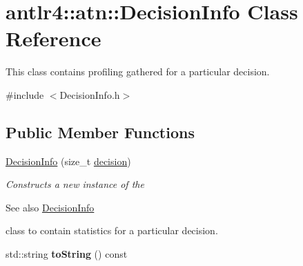 \hypertarget{classantlr4_1_1atn_1_1DecisionInfo}{}\section{antlr4\+:\+:atn\+:\+:Decision\+Info Class Reference}
\label{classantlr4_1_1atn_1_1DecisionInfo}


This class contains profiling gathered for a particular decision.  




{\ttfamily \#include $<$Decision\+Info.\+h$>$}

\subsection*{Public Member Functions}
\begin{DoxyCompactItemize}
\item 
\hyperlink{classantlr4_1_1atn_1_1DecisionInfo_a99833736f88c09563a01b57284742b88}{Decision\+Info} (size\+\_\+t \hyperlink{classantlr4_1_1atn_1_1DecisionInfo_ad81f14a210fb5e80f86ac800d56cc7bb}{decision})
\begin{DoxyCompactList}\small\item\em Constructs a new instance of the \begin{DoxySeeAlso}{See also}
\hyperlink{classantlr4_1_1atn_1_1DecisionInfo}{Decision\+Info}


\end{DoxySeeAlso}
class to contain statistics for a particular decision. \end{DoxyCompactList}\item 
\mbox{\label{classantlr4_1_1atn_1_1DecisionInfo_a20a4ba0dfbd5e17526e7e6e6e888616d}} 
std\+::string {\bfseries to\+String} () const
\end{DoxyCompactItemize}
